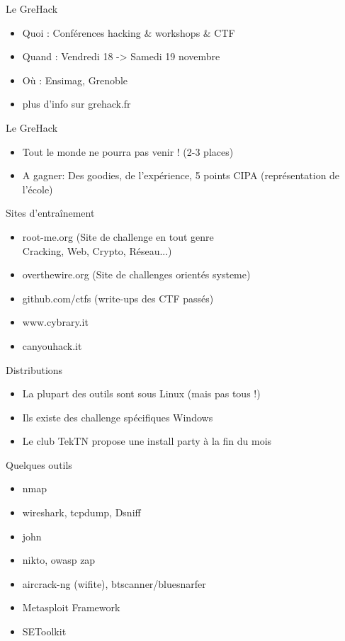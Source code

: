 \documentclass{beamer}
\begin{document}
\begin{frame} {Le GreHack}
	\begin{itemize}
		\item Quoi : Conférences hacking \& workshops \& CTF 
		\item Quand : Vendredi 18 -> Samedi 19  novembre
		\item Où : Ensimag, Grenoble 
		\item plus d'info sur grehack.fr
	\end{itemize}
\end{frame}

\begin{frame} {Le GreHack}
	\begin{itemize}
		\item Tout le monde ne pourra pas venir ! (2-3 places)
		\item A gagner: Des goodies, de l'expérience, 5 points CIPA (représentation de l'école)
	\end{itemize}
\end{frame}

\begin{frame}{Sites d'entraînement}
	\begin{itemize}
		\item root-me.org (Site de challenge en tout genre\\
		Cracking, Web, Crypto, Réseau...)
		\item overthewire.org (Site de challenges orientés systeme)
		\item github.com/ctfs (write-ups des CTF passés)
        \item www.cybrary.it		
		\item canyouhack.it
	\end{itemize}
\end{frame}

\begin{frame}{Distributions}
	\begin{itemize}
    	\item La plupart des outils sont sous Linux (mais pas tous !)
		\item Ils existe des challenge spécifiques Windows
		\item Le club TekTN propose une install party à la fin du mois
	\end{itemize}
\end{frame}

\begin{frame}{Quelques outils}
	\begin{itemize}
		\item nmap
		\item wireshark, tcpdump, Dsniff
		\item john
		\item nikto, owasp zap
		\item aircrack-ng (wifite), btscanner/bluesnarfer
		\item Metasploit Framework
		\item SEToolkit
	\end{itemize}
\end{frame}
\end{document}

